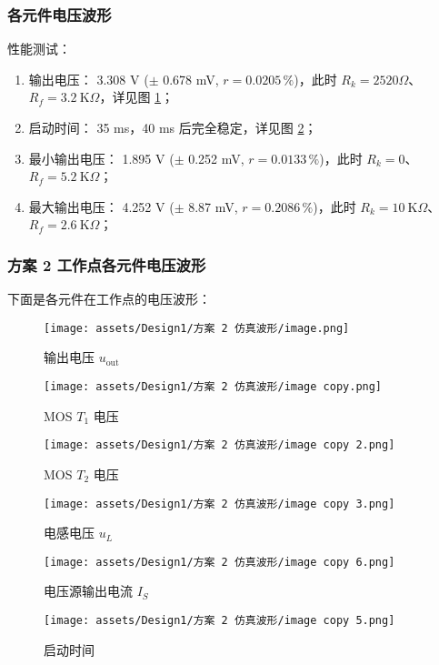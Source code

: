 \documentclass[UTF8]{article}
\def\KO{\ \mathrm{K}\Omega}
\def\KO{\ \mathrm{K}\Omega}
\theoremstyle{MyLineTheoremStyle} %
\theoremstyle{MyBlockTheoremStyle} %
\theoremstyle{MySubsubsectionStyle} %
\begin{document}
\subsubsection{各元件电压波形}
\noindent 性能测试：
\begin{enumerate}
\item 输出电压： 3.308 V ($\pm$ 0.678 mV, $r = 0.0205 \,\%$)，此时 $R_k = 2520 \Omega$、$R_f =  3.2\KO$，详见图 \ref{输出电压 2}；
\item 启动时间： 35 ms，40 ms 后完全稳定，详见图 \ref{启动时间 2}；
\item 最小输出电压： 1.895 V ($\pm$ 0.252 mV, $r = 0.0133 \,\%$)，此时 $R_k = 0 $、$R_f =  5.2\KO$；
\item 最大输出电压： 4.252 V ($\pm$ 8.87 mV, $r = 0.2086 \,\%$)，此时 $R_k = 10 \KO$、$R_f =  2.6\KO$；
\end{enumerate}

\subsubsection{方案 2 工作点各元件电压波形}
下面是各元件在工作点的电压波形：

\begin{figure}[H]\centering
    \texttt{[image: assets/Design1/方案 2 仿真波形/image.png]}
    \caption{输出电压 $u_{\text{out}}$}
    \label{输出电压 2}
\end{figure}
\begin{figure}[H]\centering
    \texttt{[image: assets/Design1/方案 2 仿真波形/image copy.png]}
    \caption{MOS $T_1$ 电压}
\end{figure}
\begin{figure}[H]\centering
    \texttt{[image: assets/Design1/方案 2 仿真波形/image copy 2.png]}
    \caption{MOS $T_2$ 电压}
\end{figure}
\begin{figure}[H]\centering
    \texttt{[image: assets/Design1/方案 2 仿真波形/image copy 3.png]}
    \caption{电感电压 $u_L$}
\end{figure}
\begin{figure}[H]\centering
    \texttt{[image: assets/Design1/方案 2 仿真波形/image copy 6.png]}
    \caption{电压源输出电流 $I_S$}
\end{figure}
\begin{figure}[H]\centering
    \texttt{[image: assets/Design1/方案 2 仿真波形/image copy 5.png]}
    \caption{启动时间}
    \label{启动时间 2}
\end{figure}
\end{document}
